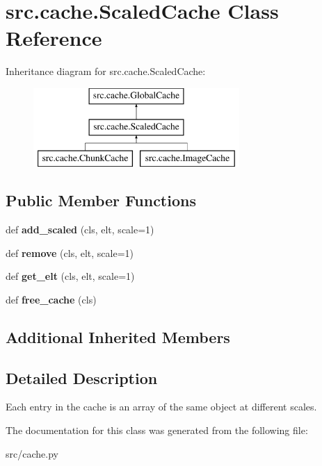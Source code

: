\hypertarget{classsrc_1_1cache_1_1_scaled_cache}{}\section{src.\+cache.\+Scaled\+Cache Class Reference}
\label{classsrc_1_1cache_1_1_scaled_cache}
Inheritance diagram for src.\+cache.\+Scaled\+Cache\+:\begin{figure}[H]
\begin{center}
\leavevmode
\includegraphics[height=3.000000cm]{classsrc_1_1cache_1_1_scaled_cache}
\end{center}
\end{figure}
\subsection*{Public Member Functions}
\begin{DoxyCompactItemize}
\item 
\hypertarget{classsrc_1_1cache_1_1_scaled_cache_a7ddc08931d3608e98e6a404aeafb5ca4}{}\label{classsrc_1_1cache_1_1_scaled_cache_a7ddc08931d3608e98e6a404aeafb5ca4} 
def {\bfseries add\+\_\+scaled} (cls, elt, scale=1)
\item 
\hypertarget{classsrc_1_1cache_1_1_scaled_cache_a725e99f25c521cd4303cf1291d7eb6b6}{}\label{classsrc_1_1cache_1_1_scaled_cache_a725e99f25c521cd4303cf1291d7eb6b6} 
def {\bfseries remove} (cls, elt, scale=1)
\item 
\hypertarget{classsrc_1_1cache_1_1_scaled_cache_a10e93fb79094287302577d7bd8ce3f21}{}\label{classsrc_1_1cache_1_1_scaled_cache_a10e93fb79094287302577d7bd8ce3f21} 
def {\bfseries get\+\_\+elt} (cls, elt, scale=1)
\item 
\hypertarget{classsrc_1_1cache_1_1_scaled_cache_ac00c05e5e36eed082de443e724876f37}{}\label{classsrc_1_1cache_1_1_scaled_cache_ac00c05e5e36eed082de443e724876f37} 
def {\bfseries free\+\_\+cache} (cls)
\end{DoxyCompactItemize}
\subsection*{Additional Inherited Members}


\subsection{Detailed Description}
\begin{DoxyVerb}Each entry in the cache is an array of the same object at
different scales.
\end{DoxyVerb}
 

The documentation for this class was generated from the following file\+:\begin{DoxyCompactItemize}
\item 
src/cache.\+py\end{DoxyCompactItemize}
